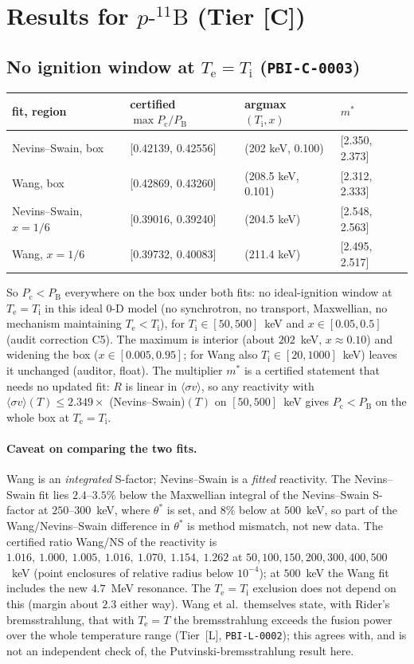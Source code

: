 \documentclass[10pt]{article}
\newcommand{\tier}[1]{\textsf{[#1]}}
\newcommand{\tL}{\tier{L}}
\newcommand{\tC}{\tier{C}}
\newcommand{\Te}{T_{\mathrm e}}
\newcommand{\Ti}{T_{\mathrm i}}
\newcommand{\pB}{p\text{-}{}^{11}\mathrm{B}}
\newcommand{\Pc}{P_{\mathrm c}}
\newcommand{\PB}{P_{\mathrm B}}
\begin{document}
\section{Results for $\pB$ (Tier \tC{})}\label{sec:pb}
\subsection{No ignition window at $\Te=\Ti$ (\texttt{PBI-C-0003})}
\begin{center}\small\begin{tabular}{p{5.2cm}p{3.6cm}p{3.4cm}p{2.2cm}}\toprule
fit, region & certified $\max\Pc/\PB$ & argmax $(\Ti,x)$ & $m^\ast$\\\midrule
Nevins--Swain, box & [0.42139, 0.42556] & (202 keV, 0.100) & [2.350, 2.373]\\
Wang, box & [0.42869, 0.43260] & (208.5 keV, 0.101) & [2.312, 2.333]\\
Nevins--Swain, $x=1/6$ & [0.39016, 0.39240] & (204.5 keV) & [2.548, 2.563]\\
Wang, $x=1/6$ & [0.39732, 0.40083] & (211.4 keV) & [2.495, 2.517]\\\bottomrule
\end{tabular}\end{center}
So $\Pc<\PB$ everywhere on the box under both fits: no ideal-ignition window at $\Te=\Ti$ in this ideal $0$-D model (no synchrotron, no transport, Maxwellian, no mechanism maintaining $\Te<\Ti$), for $\Ti\in[50,500]$~keV and $x\in[0.05,0.5]$ (audit correction C5). The maximum is interior (about $202$~keV, $x\approx0.10$) and widening the box ($x\in[0.005,0.95]$; for Wang also $\Ti\in[20,1000]$~keV) leaves it unchanged (auditor, float). The multiplier $m^\ast$ is a certified statement that needs no updated fit: $R$ is linear in $\langle\sigma v\rangle$, so any reactivity with $\langle\sigma v\rangle(T)\le2.349\times$ (Nevins--Swain)$(T)$ on $[50,500]$~keV gives $\Pc<\PB$ on the whole box at $\Te=\Ti$.

\paragraph{Caveat on comparing the two fits.} Wang is an \emph{integrated} S-factor; Nevins--Swain is a \emph{fitted} reactivity. The Nevins--Swain fit lies $2.4$--$3.5\%$ below the Maxwellian integral of the Nevins--Swain S-factor at $250$--$300$~keV, where $\theta^\ast$ is set, and $8\%$ below at $500$~keV, so part of the Wang/Nevins--Swain difference in $\theta^\ast$ is method mismatch, not new data. The certified ratio Wang/NS of the reactivity is $1.016,\ 1.000,\ 1.005,\ 1.016,\ 1.070,\ 1.154,\ 1.262$ at $50,100,150,200,300,400,500$~keV (point enclosures of relative radius below $10^{-4}$); at $500$~keV the Wang fit includes the new $4.7$~MeV resonance. The $\Te=\Ti$ exclusion does not depend on this (margin about $2.3$ either way). Wang et al.\ themselves state, with Rider's bremsstrahlung, that with $\Te=T$ the bremsstrahlung exceeds the fusion power over the whole temperature range (Tier~\tL{}, \texttt{PBI-L-0002}); this agrees with, and is not an independent check of, the Putvinski-bremsstrahlung result here.
\end{document}
